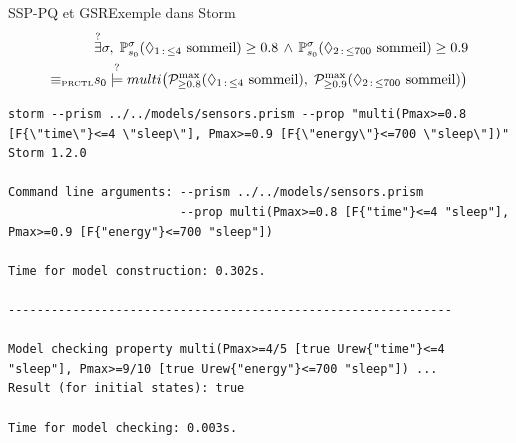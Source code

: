 \documentclass[compress]{beamer}
\theoremstyle{theorem}%
\begin{document}
\begin{frame}[fragile]{SSP-PQ et GSR}{Exemple dans Storm}
    \footnotesize
    \vspace{-0.05\linewidth}
    \begin{align*}
    &\overset{?}{\exists} \sigma, \; \mathbb{P}^{\sigma}_{s_0}(\Diamond_{1\, :\, \leq 4} \text{ sommeil}) \geq 0.8 \, \wedge \,
              \mathbb{P}^{\sigma}_{s_0}(\Diamond_{2\, :\, \leq 700} \text{ sommeil}) \geq 0.9 \\
      \equiv_{\text{\tiny PRCTL}}&s_0 \overset{?}{\models} multi\big( \mathcal{P}^{\max}_{\geq 0.8} (\Diamond_{1\, :\, \leq 4} \text{ sommeil}), \; \mathcal{P}^{\max}_{\geq 0.9} (\Diamond_{2\, :\, \leq 700} \text{ sommeil})\big)
    \end{align*}
  {\fontsize{4}{5}
  \begin{verbatim}
storm --prism ../../models/sensors.prism --prop "multi(Pmax>=0.8 [F{\"time\"}<=4 \"sleep\"], Pmax>=0.9 [F{\"energy\"}<=700 \"sleep\"])"
Storm 1.2.0

Command line arguments: --prism ../../models/sensors.prism
                        --prop multi(Pmax>=0.8 [F{"time"}<=4 "sleep"], Pmax>=0.9 [F{"energy"}<=700 "sleep"])

Time for model construction: 0.302s.

--------------------------------------------------------------

Model checking property multi(Pmax>=4/5 [true Urew{"time"}<=4 "sleep"], Pmax>=9/10 [true Urew{"energy"}<=700 "sleep"]) ...
Result (for initial states): true

Time for model checking: 0.003s.
  \end{verbatim}
  }
\end{frame}
\end{document}
